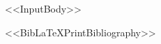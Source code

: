 \documentclass[<<DocumentClassOptions>>]{article}
\begin{document}
<<InputBody>>

<<BibLaTeXPrintBibliography>>
\end{document}
